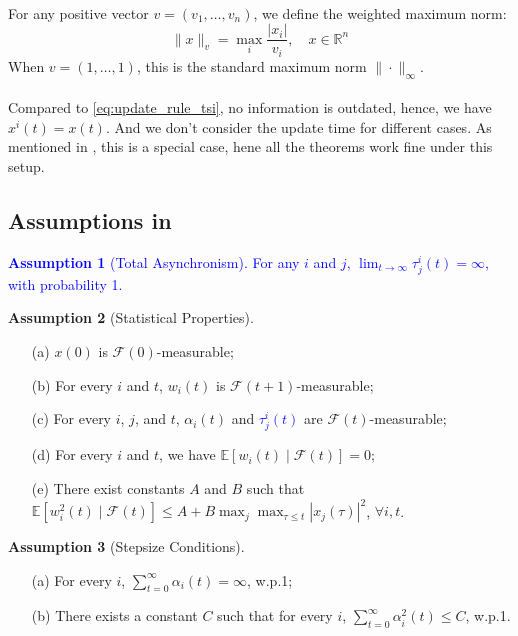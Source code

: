\\
For any positive vector $v = (v_1, \ldots, v_n)$, we define the weighted maximum norm:
\begin{equation*}
\|x\|_v = \max_i \frac{|x_i|}{v_i}, \quad x \in \mathbb{R}^n
\end{equation*}
\noindent When $v = (1,\ldots,1)$, this is the standard maximum norm $\|\cdot\|_{\infty}$.\\
\\
\noindent Compared to \autoref{eq:update_rule_tsi}, no information is outdated, hence, we have $x^i(t) = x(t)$. And we don't consider the update time for different cases. As mentioned in \cite{tsitsiklis1994asynchronous}, this is a special case, hene all the theorems work fine under this setup.

\subsection{Assumptions in \cite{tsitsiklis1994asynchronous}}

\noindent
\textcolor{blue}{\textbf{Assumption 1} (Total Asynchronism).
For any $i$ and $j$, $\lim_{t \to \infty} \tau_j^i(t) = \infty$, with probability 1.}

\vspace{1em}

\noindent
\textbf{Assumption 2} (Statistical Properties).
\begin{enumerate}
\item[(a)] $x(0)$ is $\mathcal{F}(0)$-measurable;
\item[(b)] For every $i$ and $t$, $w_i(t)$ is $\mathcal{F}(t+1)$-measurable;
\item[(c)] For every $i$, $j$, and $t$, $\alpha_i(t)$ and \textcolor{blue}{$\tau_j^i(t)$} are $\mathcal{F}(t)$-measurable;
\item[(d)] For every $i$ and $t$, we have $\mathbb{E}[w_i(t) \mid \mathcal{F}(t)] = 0$;
\item[(e)] There exist constants $A$ and $B$ such that
$\mathbb{E}[w_i^2(t) \mid \mathcal{F}(t)] \leq A + B \max_j \max_{\tau \leq t} |x_j(\tau)|^2$, $\forall i, t$.
\end{enumerate}

\vspace{1em}

\noindent
\textbf{Assumption 3} (Stepsize Conditions).
\begin{enumerate}
\item[(a)] For every $i$, $\sum_{t=0}^{\infty} \alpha_i(t) = \infty$, w.p.1;
\item[(b)] There exists a constant $C$ such that for every $i$, $\sum_{t=0}^{\infty} \alpha_i^2(t) \leq C$, w.p.1.
\end{enumerate}


